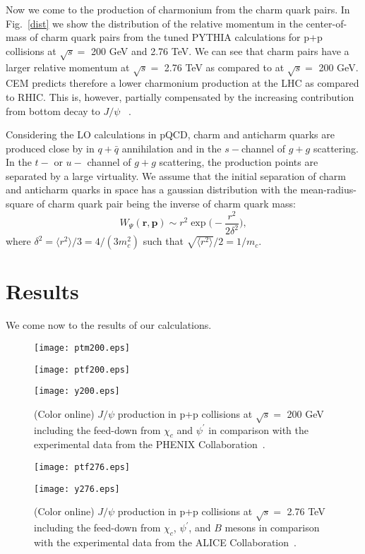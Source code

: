 \documentclass[twocolumn,aps,superscriptaddress,showpacs,nofootinbib,floatfix]{revtex4}
\newcommand{\be}{\begin{equation}}
\newcommand{\ee}{\end{equation}}
\begin{document}
Now we come to the production of charmonium from the charm quark pairs.
In Fig.~\ref{dist} we show the distribution of the relative momentum in the center-of-mass  of charm quark pairs
from the tuned PYTHIA calculations for  p+p collisions at $\sqrt{s}=$ 200 GeV and 2.76 TeV.
We can see that charm pairs have a larger relative momentum at $\sqrt{s}=$ 2.76 TeV as compared to at $\sqrt{s}=$ 200 GeV. CEM predicts therefore a lower charmonium production at the LHC as compared to RHIC. This is, however,  partially
compensated by the increasing contribution from bottom decay to $J/\psi$ ~\cite{CMS:2011ora}.

Considering the LO calculations in pQCD,
charm and anticharm quarks are produced close by in $q+\bar{q}$ annihilation and in the $s-$channel of $g+g$ scattering.
In the $t-$ or $u-$ channel of $g+g$ scattering, the production points are separated by a large virtuality.
We assume that the initial separation of charm and anticharm quarks in space has a gaussian distribution with the mean-radius-square of charm quark pair being the inverse of charm quark mass:
\be
W_\Psi(\mathbf{r,p})
\sim r^2 \exp\bigg(-\frac{r^2}{2\delta^2}\bigg),
\ee
where $\delta^2=\langle r^2\rangle/3=4/(3m_c^2)$ such that $\sqrt{\langle r^2\rangle}/2=1/m_c$.

\section{Results}

We come now to the results of our calculations.
\begin{figure}[!h]
\centerline{
\texttt{[image: ptm200.eps]}}
\centerline{
\texttt{[image: ptf200.eps]}}
\centerline{
\texttt{[image: y200.eps]}}
\caption{(Color online) $J/\psi$ production in p+p collisions at $\sqrt{s}=$ 200 GeV including the feed-down from $\chi_c$ and $\psi^\prime$ in comparison with the experimental data from the PHENIX Collaboration~\cite{Adare:2006kf}.}
\label{rhic}
\end{figure}

\begin{figure}[!h]
\centerline{
\texttt{[image: ptf276.eps]}}
\centerline{
\texttt{[image: y276.eps]}}
\caption{(Color online) $J/\psi$ production in p+p collisions at $\sqrt{s}=$ 2.76 TeV including the feed-down from $\chi_c$, $\psi^\prime$, and $B$ mesons in comparison with the experimental data from the ALICE Collaboration~\cite{Abelev:2012kr}.}
\label{lhc}
\end{figure}
\end{document}
